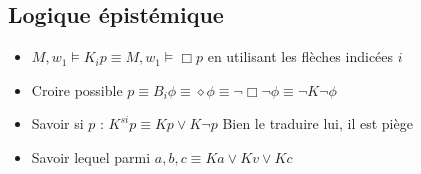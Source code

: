 \documentclass{article}
\theoremstyle{plain}%
\theoremstyle{definition}
\theoremstyle{remark}
\begin{document}
\subsection{Logique épistémique}
\begin{itemize}
    \item $ M, w_1 \models K_i p \equiv M, w_1 \models \Box p $ en utilisant les flèches indicées $ i $
    \item Croire possible $ p \equiv B_i \phi \equiv \diamond \phi \equiv \neg \Box \neg \phi \equiv \neg K \neg \phi  $ 
    \item Savoir si $ p $ : $ K^{si} p \equiv K p \vee K \neg p $ Bien le traduire lui, il est piège
    \item Savoir lequel parmi $ a,b,c \equiv K a \vee K v \vee K c $ 
\end{itemize}
\end{document}
